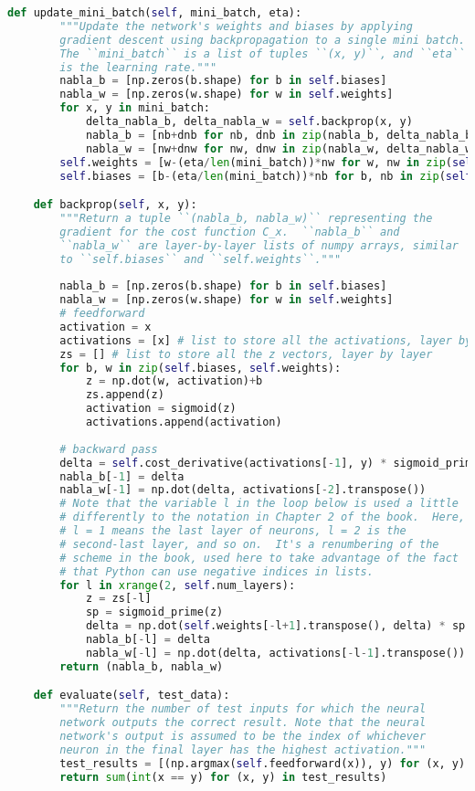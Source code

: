\begin{lstlisting}[language=Python, caption=Codi original per la xarxa neuronal clàssica]
	def update_mini_batch(self, mini_batch, eta):
		"""Update the network's weights and biases by applying
		gradient descent using backpropagation to a single mini batch.
		The ``mini_batch`` is a list of tuples ``(x, y)``, and ``eta``
		is the learning rate."""
		nabla_b = [np.zeros(b.shape) for b in self.biases]
		nabla_w = [np.zeros(w.shape) for w in self.weights]
		for x, y in mini_batch:
			delta_nabla_b, delta_nabla_w = self.backprop(x, y)
			nabla_b = [nb+dnb for nb, dnb in zip(nabla_b, delta_nabla_b)]
			nabla_w = [nw+dnw for nw, dnw in zip(nabla_w, delta_nabla_w)]
		self.weights = [w-(eta/len(mini_batch))*nw for w, nw in zip(self.weights, nabla_w)]
		self.biases = [b-(eta/len(mini_batch))*nb for b, nb in zip(self.biases, nabla_b)]

	def backprop(self, x, y):
		"""Return a tuple ``(nabla_b, nabla_w)`` representing the
		gradient for the cost function C_x.  ``nabla_b`` and
		``nabla_w`` are layer-by-layer lists of numpy arrays, similar
		to ``self.biases`` and ``self.weights``."""
		
		nabla_b = [np.zeros(b.shape) for b in self.biases]
		nabla_w = [np.zeros(w.shape) for w in self.weights]
		# feedforward
		activation = x
		activations = [x] # list to store all the activations, layer by layer
		zs = [] # list to store all the z vectors, layer by layer
		for b, w in zip(self.biases, self.weights):
			z = np.dot(w, activation)+b
			zs.append(z)
			activation = sigmoid(z)
			activations.append(activation)
			
		# backward pass
		delta = self.cost_derivative(activations[-1], y) * sigmoid_prime(zs[-1])
		nabla_b[-1] = delta
		nabla_w[-1] = np.dot(delta, activations[-2].transpose())
		# Note that the variable l in the loop below is used a little
		# differently to the notation in Chapter 2 of the book.  Here,
		# l = 1 means the last layer of neurons, l = 2 is the
		# second-last layer, and so on.  It's a renumbering of the
		# scheme in the book, used here to take advantage of the fact
		# that Python can use negative indices in lists.
		for l in xrange(2, self.num_layers):
			z = zs[-l]
			sp = sigmoid_prime(z)
			delta = np.dot(self.weights[-l+1].transpose(), delta) * sp
			nabla_b[-l] = delta
			nabla_w[-l] = np.dot(delta, activations[-l-1].transpose())
		return (nabla_b, nabla_w)

	def evaluate(self, test_data):
		"""Return the number of test inputs for which the neural
		network outputs the correct result. Note that the neural
		network's output is assumed to be the index of whichever
		neuron in the final layer has the highest activation."""
		test_results = [(np.argmax(self.feedforward(x)), y) for (x, y) in test_data]
		return sum(int(x == y) for (x, y) in test_results)


\end{lstlisting}
